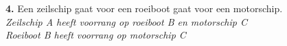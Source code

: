 \vspace{-0.7cm}
\begin{figure}[H]
	\centering
	\begin{minipage}[t]{0.70\textwidth}
		\textbf{4.} Een zeilschip gaat voor een roeiboot gaat voor een motorschip.\\
		\textit{Zeilschip A heeft voorrang op roeiboot B en motorschip C\\
			Roeiboot B heeft voorrang op motorschip C}
	\end{minipage}
	\hfill
	\begin{minipage}[t]{0.20\textwidth}
		\label{pic:kr4}
	\end{minipage}
	\hfill
\end{figure}

